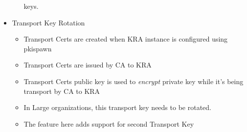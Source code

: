 \documentclass[a4paper]{article}
\begin{document}
\begin{itemize}
\begin{itemize}
                keys.
        \end{itemize}
    \item Transport Key Rotation
        \begin{itemize}
            \item Transport Certs are created when KRA instance is configured using pkispawn
            \item Transport Certs are issued by CA to KRA
            \item Transport Certs public key is used to \textit{encrypt} private key while it's being
                transport by CA to KRA 
            \item In Large organizations, this transport key needs to be rotated. 
            \item The feature here adds support for second Transport Key 
        \end{itemize}
\end{itemize}
\end{document}
